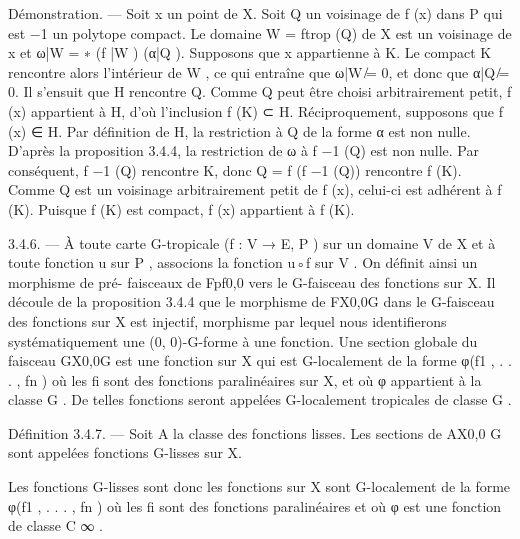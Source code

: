 \documentclass[
  10pt,
]{article}
\newenvironment{Shaded}{}{}
\newcommand{\NormalTok}[1]{#1}
\begin{document}
\begin{Shaded}
\begin{Highlighting}[]
\NormalTok{Démonstration. — Soit x un point de X. Soit Q un voisinage de f (x) dans P qui est}
\NormalTok{                                             −1}
\NormalTok{un polytope compact. Le domaine W = ftrop       (Q) de X est un voisinage de x et ω|W =}
\NormalTok{       ∗}
\NormalTok{(f |W ) (α|Q ).}
\NormalTok{   Supposons que x appartienne à K. Le compact K rencontre alors l’intérieur de W , ce}
\NormalTok{qui entraîne que ω|W ̸= 0, et donc que α|Q ̸= 0. Il s’ensuit que H rencontre Q. Comme}
\NormalTok{Q peut être choisi arbitrairement petit, f (x) appartient à H, d’où l’inclusion f (K) ⊂ H.}
\NormalTok{   Réciproquement, supposons que f (x) ∈ H. Par définition de H, la restriction à Q de}
\NormalTok{la forme α est non nulle. D’après la proposition 3.4.4, la restriction de ω à f −1 (Q) est}
\NormalTok{non nulle. Par conséquent, f −1 (Q) rencontre K, donc Q = f (f −1 (Q)) rencontre f (K).}
\NormalTok{Comme Q est un voisinage arbitrairement petit de f (x), celui{-}ci est adhérent à f (K).}
\NormalTok{Puisque f (K) est compact, f (x) appartient à f (K).}

\NormalTok{3.4.6. — À toute carte G{-}tropicale (f : V → E, P ) sur un domaine V de X et à toute}
\NormalTok{fonction u sur P , associons la fonction u◦f sur V . On définit ainsi un morphisme de pré{-}}
\NormalTok{faisceaux de Fpf0,0 vers le G{-}faisceau des fonctions sur X. Il découle de la proposition 3.4.4}
\NormalTok{que le morphisme de FX0,0G dans le G{-}faisceau des fonctions sur X est injectif, morphisme}
\NormalTok{par lequel nous identifierons systématiquement une (0, 0){-}G{-}forme à une fonction.}
\NormalTok{   Une section globale du faisceau GX0,0G est une fonction sur X qui est G{-}localement de la}
\NormalTok{forme φ(f1 , . . . , fn ) où les fi sont des fonctions paralinéaires sur X, et où φ appartient}
\NormalTok{à la classe G . De telles fonctions seront appelées G{-}localement tropicales de classe G .}

\NormalTok{Définition 3.4.7. — Soit A la classe des fonctions lisses. Les sections de AX0,0}
\NormalTok{                                                                              G}
\NormalTok{                                                                                 sont}
\NormalTok{appelées fonctions G{-}lisses sur X.}

\NormalTok{   Les fonctions G{-}lisses sont donc les fonctions sur X sont G{-}localement de la forme}
\NormalTok{φ(f1 , . . . , fn ) où les fi sont des fonctions paralinéaires et où φ est une fonction de}
\NormalTok{classe C ∞ .}
\end{Highlighting}
\end{Shaded}
\end{document}
